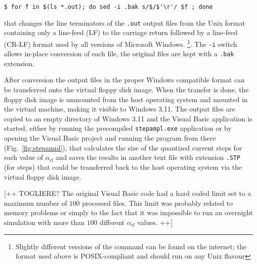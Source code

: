 \begin{lstlisting}
$ for f in $(ls *.out); do sed -i .bak s/$/$'\r'/ $f ; done
\end{lstlisting}

that changes the line terminators of the \texttt{.out} output files from the Unix format containing only a line-feed (LF) to the carriage return followed by a line-feed (CR-LF) format used by all versions of Microsoft Windows. 
\footnote{Slightly different versions of the command can be found on the internet; the format used above is POSIX-compliant and should run on any Unix flavour}.
The \texttt{-i} switch allows in-place conversion of each file, the original files are kept with a \texttt{.bak} extension.

After conversion the output files in the proper Windows compatible format can be transferred onto the virtual floppy disk image. %
When the transfer is done, the floppy disk image is unmounted from the host operating system and mounted  in the virtual machine, making it visible to Windows 3.11. 
The output files are copied to an empty directory of Windows 3.11 and the Visual Basic application is started, either by running the precompiled \texttt{stepampl.exe} application or by opening the Visual Basic project and running the program from there (Fig.~\ref{fig:stepampl}), that calculates the size of the quantized current steps for each value of $\alpha_\mathrm{rf}$ and saves the results in another text file with extension \texttt{.STP} (for steps) that could be transferred back to the host operating system via the virtual floppy disk image.

[++ TOGLIERE? The original Visual Basic code had a hard coded limit set to a maximum number of $100$ processed files. This limit was probably related to memory problems or simply to the fact that it was impossible to run an overnight simulation with more than $100$ different $\alpha_\mathrm{rf}$ values. ++]

